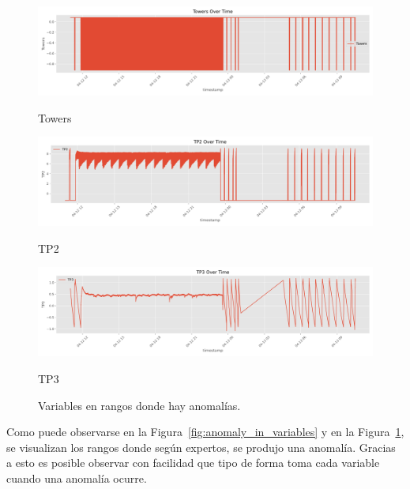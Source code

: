 \documentclass[12pt,letterpaper]{article}
\begin{document}
\begin{figure}[htp]
    \centering
    \vspace{0.5em}

    \begin{minipage}[b]{0.45\textwidth}
        \centering
        \includegraphics[width=\textwidth]{Towers.png}
        \caption*{Towers}
    \end{minipage}
    \hfill
    \begin{minipage}[b]{0.45\textwidth}
        \centering
        \includegraphics[width=\textwidth]{TP2.png}
        \caption*{TP2}
    \end{minipage}
    \vspace{0.5em}

    \begin{minipage}[b]{0.45\textwidth}
        \centering
        \includegraphics[width=\textwidth]{TP3.png}
        \caption*{TP3}
    \end{minipage}

    \caption{Variables en rangos donde hay anomalías.}
    \label{fig:anomaly_in_variables2}
\end{figure}

Como puede observarse en la Figura~\ref{fig:anomaly_in_variables} y en la Figura~\ref{fig:anomaly_in_variables2}, se visualizan los rangos donde según expertos, se produjo una anomalía. Gracias a esto es posible observar con facilidad que tipo de forma toma cada variable cuando una anomalía ocurre.
\end{document}
